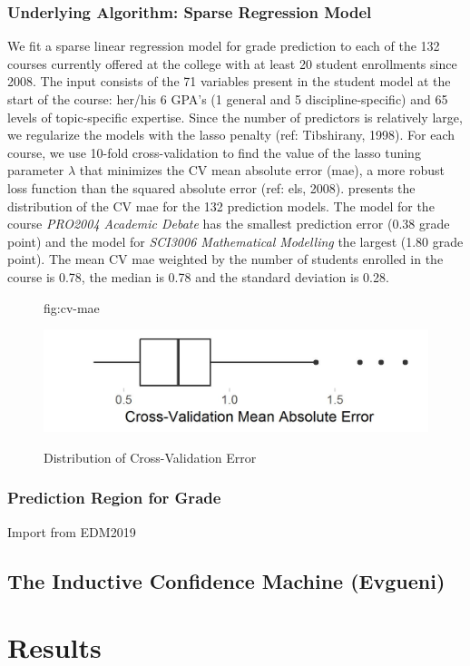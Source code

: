 \documentclass[pmlr]{jmlr}%
\begin{document}
\subsubsection{Underlying Algorithm: Sparse Regression Model}
\label{sec:sm}

We fit a sparse linear regression model for grade prediction to each of the 132 courses currently offered at the college with at least 20 student enrollments since 2008. The input consists of the 71 variables present in the student model at the start of the course: her/his 6 GPA's  (1 general and 5 discipline-specific) and 65 levels of topic-specific expertise. Since the number of predictors is relatively large, we regularize the models with the lasso penalty (ref: Tibshirany, 1998). For each course, we use 10-fold cross-validation to find the value of the lasso tuning parameter $\lambda$ that minimizes the CV mean absolute error (mae), a more robust loss function than the squared absolute error (ref: els, 2008).  presents the distribution of the CV mae for the 132 prediction models. The model for the course \textit{PRO2004 Academic Debate} has the smallest prediction error (0.38 grade point) and the model for \textit{SCI3006 Mathematical Modelling} the largest (1.80 grade point). The mean CV mae weighted by the number of students enrolled in the course is 0.78, the median is 0.78 and the standard deviation is 0.28.


\begin{figure}[htbp]
	\floatconts
	{fig:cv-mae}
	{\caption{Distribution of Cross-Validation Error}}
	{\includegraphics[width=0.5\linewidth]{figures/cv-mae}}
\end{figure}


\subsubsection{Prediction Region for Grade}
\label{sec:warning}
Import from EDM2019

\subsection{The Inductive Confidence Machine (Evgueni)}
\label{sec:icm}

\section{Results}
\label{sec:results}
\end{document}
